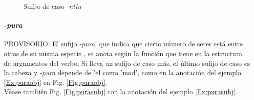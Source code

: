 \documentclass[a4paper,11pt,DIV12]{scrartcl}
\begin{document}
\begin{figure}
 \begin{center}
\end{center}
\caption{Sufijo de caso {\em -ntin}}\label{Fig:ntin}
\end{figure}


\paragraph{{\em -pura}} 
PROVISORIO:
El sufijo {\em -pura}, que indica que cierto n\'umero de seres est\'a entre otros de su misma especie \citep[168]{Soto06}, se anota seg\'un la funci\'on que tiene en la estructura de argumentos del verbo. Si lleva un sufijo de caso m\'as, el \'ultimo sufijo de caso es la cabeza y {\em -pura} depende de 'el como 'mod', como en la anotaci\'on del ejemplo \ref{Ex:puraobj} en Fig. \ref{Fig:puraobj}.\\
V\'ease tambi\'en Fig. \ref{Fig:purasubj} con la anotaci\'on del ejemplo \ref{Ex:purasubj}. 
\end{document}
